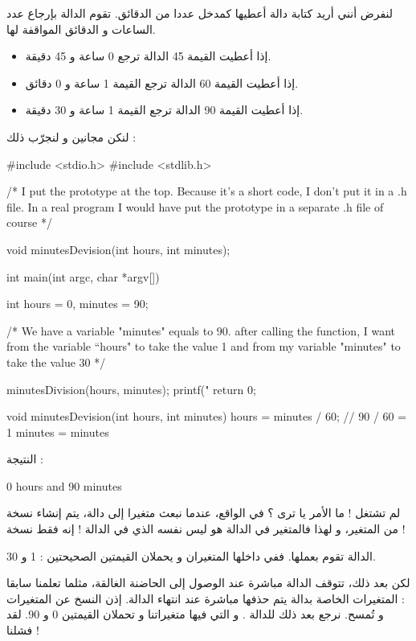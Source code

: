لنفرض أنني أريد كتابة دالة أعطيها كمدخل عددا من الدقائق. تقوم الدالة بإرجاع عدد الساعات و الدقائق المواقفة لها.

\begin{itemize}
  \item إذا أعطيت القيمة 45  الدالة ترجع 0 ساعة و 45 دقيقة.
  \item إذا أعطيت القيمة 60 الدالة ترجع القيمة  1 ساعة و 0 دقائق.
	\item إذا أعطيت القيمة 90 الدالة ترجع القيمة  1 ساعة و 30 دقيقة.
\end{itemize}

لنكن مجانين و لنجرّب ذلك :

\begin{Csource}
#include <stdio.h>
#include <stdlib.h>

/* I put the prototype at the top.
Because it's a short code, I don't put it in a .h file.
In a real program I would have put the prototype
in a separate .h file of course */

void minutesDevision(int hours, int minutes);

int main(int argc, char *argv[])
{
	int hours = 0, minutes = 90;

/* We have a variable "minutes" equals to 90.
   after calling the function, I want from the variable
“hours" to take the value 1 and from my variable
"minutes" to take the value 30 */

	minutesDivision(hours, minutes);
	printf("%
	return 0;
}

void minutesDevision(int hours, int minutes)
{
	hours = minutes / 60;  // 90 / 60 = 1
	minutes = minutes %
}
\end{Csource}

النتيجة :

\begin{Console}
0 hours and 90 minutes
\end{Console}

لم تشتغل ! ما الأمر يا ترى ؟
في الواقع، عندما نبعث متغيرا إلى دالة، يتم إنشاء نسخة من المتغير، و لهذا فالمتغير
في الدالة
هو ليس نفسه الذي في الدالة
 !
إنه فقط نسخة !

الدالة
تقوم بعملها. ففي داخلها المتغيران
و
يحملان القيمتين الصحيحتين : 1 و 30.

لكن بعد ذلك، تتوقف الدالة مباشرة عند الوصول إلى الحاضنة الغالقة، مثلما تعلمنا سابقا : المتغيرات الخاصة بدالة يتم حذفها مباشرة عند انتهاء الدالة. إذن النسخ عن المتغيرات
و
تُمسح.
نرجع بعد ذلك للدالة
.
و التي فيها متغيراتنا
و
تحملان القيمتين 0 و 90. لقد فشلنا !

